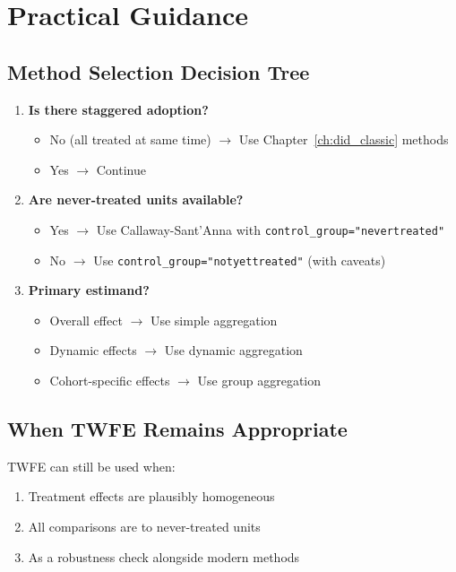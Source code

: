 \section{Practical Guidance}
\label{sec:modern_guidance}

\subsection{Method Selection Decision Tree}

\begin{enumerate}
    \item \textbf{Is there staggered adoption?}
    \begin{itemize}
        \item No (all treated at same time) $\to$ Use Chapter~\ref{ch:did_classic} methods
        \item Yes $\to$ Continue
    \end{itemize}
    \item \textbf{Are never-treated units available?}
    \begin{itemize}
        \item Yes $\to$ Use Callaway-Sant'Anna with \texttt{control\_group="nevertreated"}
        \item No $\to$ Use \texttt{control\_group="notyettreated"} (with caveats)
    \end{itemize}
    \item \textbf{Primary estimand?}
    \begin{itemize}
        \item Overall effect $\to$ Use simple aggregation
        \item Dynamic effects $\to$ Use dynamic aggregation
        \item Cohort-specific effects $\to$ Use group aggregation
    \end{itemize}
\end{enumerate}

\subsection{When TWFE Remains Appropriate}

TWFE can still be used when:
\begin{enumerate}
    \item Treatment effects are plausibly homogeneous
    \item All comparisons are to never-treated units
    \item As a robustness check alongside modern methods
\end{enumerate}

